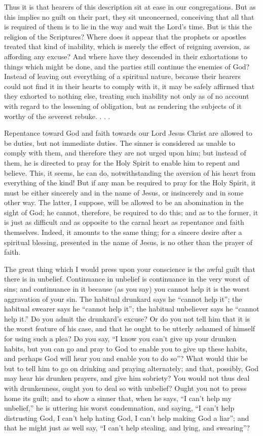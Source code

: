 \documentclass[
]{book}
\begin{document}
Thus it is that hearers of this description sit at ease in our congregations. But as this implies no guilt on their part, they sit unconcerned, conceiving that all that is required of them is to lie in the way and wait the Lord's time. But is this the religion of the Scriptures? Where does it appear that the prophets or apostles treated that kind of inability, which is merely the effect of reigning aversion, as affording any excuse? And where have they descended in their exhortations to things which might be done, and the parties still continue the enemies of God? Instead of leaving out everything of a spiritual nature, because their hearers could not find it in their hearts to comply with it, it may be safely affirmed that they exhorted to nothing else, treating such inability not only as of no account with regard to the lessening of obligation, but as rendering the subjects of it worthy of the severest rebuke. . . .

Repentance toward God and faith towards our Lord Jesus Christ are allowed to be duties, but not immediate duties. The sinner is considered as unable to comply with them, and therefore they are not urged upon him; but instead of them, he is directed to pray for the Holy Spirit to enable him to repent and believe. This, it seems, he can do, notwithstanding the aversion of his heart from everything of the kind! But if any man be required to pray for the Holy Spirit, it must be either sincerely and in the name of Jesus, or insincerely and in some other way. The latter, I suppose, will be allowed to be an abomination in the sight of God; he cannot, therefore, be required to do this; and as to the former, it is just as difficult and as opposite to the carnal heart as repentance and faith themselves. Indeed, it amounts to the same thing; for a sincere desire after a spiritual blessing, presented in the name of Jesus, is no other than the prayer of faith.

The great thing which I would press upon your conscience is the awful guilt that there is in unbelief. Continuance in unbelief is continuance in the very worst of sins; and continuance in it because (as you say) you cannot help it is the worst aggravation of your sin. The habitual drunkard says he ``cannot help it''; the habitual swearer says he ``cannot help it''; the habitual unbeliever says he ``cannot help it.'' Do you admit the drunkard's excuse? Or do you not tell him that it is the worst feature of his case, and that he ought to be utterly ashamed of himself for using such a plea? Do you say, ``I know you can't give up your drunken habits, but you can go and pray to God to enable you to give up these habits, and perhaps God will hear you and enable you to do so''? What would this be but to tell him to go on drinking and praying alternately; and that, possibly, God may hear his drunken prayers, and give him sobriety? You would not thus deal with drunkenness, ought you to deal so with unbelief? Ought you not to press home its guilt; and to show a sinner that, when he says, ``I can't help my unbelief,'' he is uttering his worst condemnation, and saying, ``I can't help distrusting God, I can't help hating God, I can't help making God a liar''; and that he might just as well say, ``I can't help stealing, and lying, and swearing''?
\end{document}
